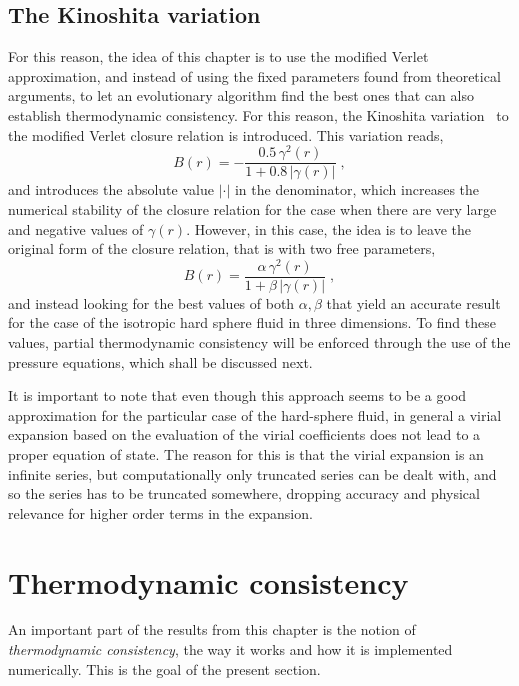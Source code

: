 \subsection{The Kinoshita variation}
For this reason, the idea of this chapter is to use the modified Verlet approximation, and instead of using the fixed parameters found from theoretical arguments, to let an evolutionary algorithm find the best ones that can also establish thermodynamic consistency. For this reason, the Kinoshita variation~\cite{kinoshitaInteractionSurfacesSolvophobicity2003} to the modified Verlet closure relation is introduced. This variation reads,
\begin{equation}
    B(r) = - \frac{0.5 \, \gamma^{2}(r)}{1 + 0.8 \, \left\lvert \gamma(r) \right\rvert}
    \; ,
    \label{eq:kinoshita-eq}
\end{equation}
and introduces the absolute value \(\left\lvert \cdot \right\rvert\) in the denominator, 
which increases the numerical stability of the closure relation for the case when there are 
very large and negative values of \(\gamma(r)\). However, in this case, the idea is to leave the original form of the closure relation, that is with two free parameters,
\begin{equation}
    B(r) = \frac{\alpha \, \gamma^{2}(r)}{1 + \beta \, \left\lvert \gamma(r) \right\rvert}
    \; ,
    \label{eq:kinoshita-params}
\end{equation}
and instead looking for the best values of both \(\alpha, \beta\) that yield an accurate 
result for the case of the isotropic hard sphere fluid in three dimensions.
To find these values, partial thermodynamic consistency will be enforced through the use of 
the pressure equations, which shall be discussed next.

It is important to note that even though this approach seems to be a good approximation for
the particular case of the hard-sphere fluid, in general a virial expansion based on the
evaluation of the virial coefficients does not lead to a proper equation of state. The 
reason for this is that the virial expansion is an infinite series, but computationally 
only truncated series can be dealt with, and so the series has to be truncated somewhere, 
dropping accuracy and physical relevance for higher order terms in the expansion.

\section{Thermodynamic consistency}
An important part of the results from this chapter is the notion of 
\emph{thermodynamic consistency}, the way it works and how it is implemented numerically. 
This is the goal of the present section.

